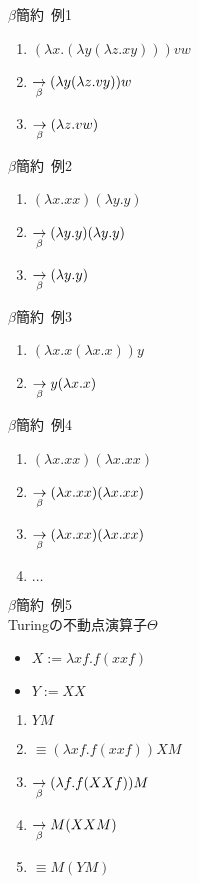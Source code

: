 \documentclass[pdflatex,17pt]{beamer}
\begin{document}
\begin{frame}{$\beta$簡約~例1}
    \begin{enumerate}
        \item $(\lambda x. (\lambda y (\lambda z. x y)))vw$
        \item $\underset{\beta}{\to} (\lambda y (\lambda z. v y))w$
        \item $\underset{\beta}{\to} (\lambda z. v w)$
    \end{enumerate}
\end{frame}

\begin{frame}{$\beta$簡約~例2}
    \begin{enumerate}
        \item $(\lambda x. x x)(\lambda y. y)$
        \item $\underset{\beta}{\to} (\lambda y. y)(\lambda y. y)$
        \item $\underset{\beta}{\to} (\lambda y. y)$
    \end{enumerate}
\end{frame}

\begin{frame}{$\beta$簡約~例3}
    \begin{enumerate}
        \item $(\lambda x. x (\lambda x. x))y$
        \item $\underset{\beta}{\to} y(\lambda x. x)$
    \end{enumerate}
\end{frame}

\begin{frame}{$\beta$簡約~例4}
    \begin{enumerate}
        \item $(\lambda x. x x)(\lambda x. x x)$
        \item $\underset{\beta}{\to} (\lambda x. x x)(\lambda x. x x)$
        \item $\underset{\beta}{\to} (\lambda x. x x)(\lambda x. x x)$
        \item $\dots$
    \end{enumerate}
\end{frame}

\begin{frame}{$\beta$簡約~例5 \\ \small Turingの不動点演算子$\Theta$}
    \begin{itemize}
        \item \small $X := \lambda x f. f (x x f)$
        \item \small $Y := XX$
    \end{itemize}
    \begin{enumerate}
        \item \small $YM$
        \pause
        \item \small $\equiv (\lambda x f. f (x x f))XM$
        \pause
        \item \small $\underset{\beta}{\to} (\lambda f. f (XXf))M$
        \pause
        \item \small $\underset{\beta}{\to} M(XXM)$
        \pause
        \item \small $\equiv M(YM)$
    \end{enumerate}
\end{frame}
\end{document}
